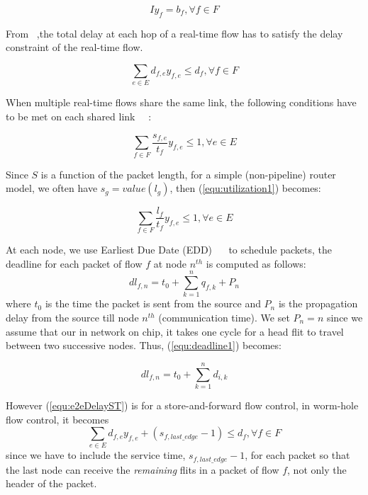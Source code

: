 \documentclass[conference, twocolumn]{IEEEtran}
\theoremstyle{definition}
\begin{document}
\begin{equation}\label{connectivity1} Iy_f=b_f,\forall f \in F
\end{equation}

From ~\cite{Ferrari90ascheme},the total delay at each hop of a real-time flow
has to satisfy the delay constraint of the real-time flow.

\begin{equation}\label{equ:e2eDelayST}
\sum_{e \in E}d_{f,e}y_{f,e} \leq d_f, \forall f \in F
\end{equation}

When multiple real-time flows share the same link, the following conditions
 have to be met on each shared link ~\cite{Ferrari90ascheme}~\cite{VermaJitter91}:

\begin{equation}\label{equ:utilization1}
\sum_{f \in F}\frac{s_{f,e}}{t_f}y_{f,e} \leq 1, \forall e \in E
\end{equation}

Since $S$ is a function of the packet length, for a simple (non-pipeline) router
model, we often have $s_g=value(l_g)$, then (\ref{equ:utilization1}) becomes:

\begin{equation}\label{equ:utilization2}
\sum_{f \in F}\frac{l_f}{t_f}y_{f,e} \leq 1, \forall e \in E
\end{equation}

At each node, we use Earliest Due Date (EDD)
~\cite{VermaJitter91}~\cite{LiuSchedulingRT} to schedule packets, the deadline
for each packet of flow $f$ at node $n^{th}$ is computed as follows:
\begin{equation}\label{equ:deadline1}
dl_{f,n}=t_0 + \sum_{k=1}^{n}q_{f,k}+P_n
\end{equation}
where $t_0$ is the time the packet is sent from the source and $P_n$ is the propagation
delay from the source till node $n^{th}$ (communication time). We set
$P_n=n$ since we assume that our in network on chip, it takes one cycle for a
head flit to travel between two successive nodes. Thus, (\ref{equ:deadline1}) becomes:

\begin{equation}\label{equ:deadline2}
dl_{f,n}=t_0 + \sum_{k=1}^{n}d_{i,k}
\end{equation}

However (\ref{equ:e2eDelayST}) is for a store-and-forward flow control, in
worm-hole flow control, it becomes
\begin{equation}\label{equ:e2eDelayCT}
\sum_{e \in E}d_{f,e}y_{f,e} + (s_{f,last\_edge} - 1) \leq d_f, \forall f \in F
\end{equation}
since we have to include the service time, $s_{f,last\_edge}-1$, for each
packet so that the last node can receive the {\em remaining} flits in a
packet of flow $f$, not only the header of the packet.
\end{document}
